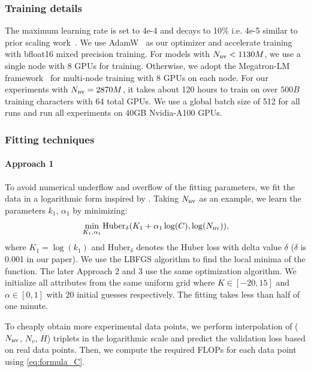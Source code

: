 \subsubsection{Training details}
\label{appendx:training}
The maximum learning rate is set to 4e-4 and decays to 10\% i.e. 4e-5 similar to prior scaling work~\citep{hoffmann2022training,muennighoff2024scaling}. We use AdamW~\citep{loshchilov2017decoupled} as our optimizer and accelerate training with bfloat16 mixed precision training. For models with $N_{\rm nv}<1130M$, we use a single node with 8 GPUs for training. Otherwise, we adopt the Megatron-LM framework~\citep{shoeybi2019megatron} for multi-node training with 8 GPUs on each node. For our experiments with $N_{\rm nv}=2870M$, it takes about 120 hours to train on over $500B$ training characters with 64 total GPUs. We use a global batch size of 512 for all runs and run all experiments on 40GB Nvidia-A100 GPUs.

\subsubsection{Fitting techniques}
\label{append:fitting_tech}
\paragraph{Approach 1} To avoid numerical underflow and overflow of the fitting parameters, we fit the data in a logarithmic form inspired by \citet{hoffmann2022training}. Taking $N_{\rm nv}$ as an example, we learn the parameters $k_1$, $ \alpha_1$ by minimizing:
\begin{equation}
    \min_{K_1, \alpha_1} \text{Huber}_\delta (K_1+\alpha_1\log(C), \log(N_{\rm nv})),
\end{equation}
where $K_1 = \log (k_1)$ and $\text{Huber}_\delta$ denotes the Huber loss with delta value $\delta$ ($\delta$ is 0.001 in our paper). We use the LBFGS algorithm to find the local minima of the function. The later Approach 2 and 3 use the same optimization algorithm. We initialize all attributes from the same uniform grid where $K \in [-20,15]$ and $\alpha \in  [0,1]$ with 20 initial guesses respectively. The fitting takes less than half of one minute.

To cheaply obtain more experimental data points, we perform interpolation of ($N_{\rm nv}$, $N_v$, $H$) triplets in the logarithmic scale and predict the validation loss based on real data points. Then, we compute the required FLOPs for each data point using \autoref{eq:formula_C}. 

